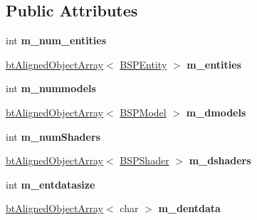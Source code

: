\subsection*{Public Attributes}
\begin{DoxyCompactItemize}
\item 
\hypertarget{class_bsp_loader_a44a8d25c3b8a62c6e501cbd1b9a1c2b5}{int {\bfseries m\+\_\+num\+\_\+entities}}\label{class_bsp_loader_a44a8d25c3b8a62c6e501cbd1b9a1c2b5}

\item 
\hypertarget{class_bsp_loader_a4789b757069ea69b198c95be7e36fb3c}{\hyperlink{classbt_aligned_object_array}{bt\+Aligned\+Object\+Array}$<$ \hyperlink{struct_b_s_p_entity}{B\+S\+P\+Entity} $>$ {\bfseries m\+\_\+entities}}\label{class_bsp_loader_a4789b757069ea69b198c95be7e36fb3c}

\item 
\hypertarget{class_bsp_loader_a8dc897891c13fec40bb04e76d798355d}{int {\bfseries m\+\_\+nummodels}}\label{class_bsp_loader_a8dc897891c13fec40bb04e76d798355d}

\item 
\hypertarget{class_bsp_loader_a76c96770e1e7543f85df61f312f0eca9}{\hyperlink{classbt_aligned_object_array}{bt\+Aligned\+Object\+Array}$<$ \hyperlink{struct_b_s_p_model}{B\+S\+P\+Model} $>$ {\bfseries m\+\_\+dmodels}}\label{class_bsp_loader_a76c96770e1e7543f85df61f312f0eca9}

\item 
\hypertarget{class_bsp_loader_a7496f45ad37530f9d33e20ea727052db}{int {\bfseries m\+\_\+num\+Shaders}}\label{class_bsp_loader_a7496f45ad37530f9d33e20ea727052db}

\item 
\hypertarget{class_bsp_loader_ae24e043b922d468b0b7e2d4602e4765c}{\hyperlink{classbt_aligned_object_array}{bt\+Aligned\+Object\+Array}$<$ \hyperlink{struct_b_s_p_shader}{B\+S\+P\+Shader} $>$ {\bfseries m\+\_\+dshaders}}\label{class_bsp_loader_ae24e043b922d468b0b7e2d4602e4765c}

\item 
\hypertarget{class_bsp_loader_abac517283ff3411cc5e7c32f7bbe1dbc}{int {\bfseries m\+\_\+entdatasize}}\label{class_bsp_loader_abac517283ff3411cc5e7c32f7bbe1dbc}

\item 
\hypertarget{class_bsp_loader_a72f4c3b7bbebc1d6aa26fb1c2253bb96}{\hyperlink{classbt_aligned_object_array}{bt\+Aligned\+Object\+Array}$<$ char $>$ {\bfseries m\+\_\+dentdata}}\label{class_bsp_loader_a72f4c3b7bbebc1d6aa26fb1c2253bb96}


\end{DoxyCompactItemize}
